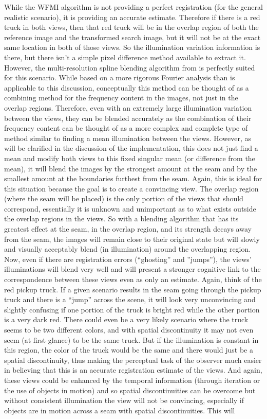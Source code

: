 While the WFMI algorithm is not providing a perfect registration (for the general realistic scenario), it is providing an accurate estimate. Therefore if there is a red truck in both views, then that red truck will be in the overlap region of both the reference image and the transformed search image, but it will not be at the exact same location in both of those views. So the illumination variation information is there, but there isn't a simple pixel difference method available to extract it. However, the multi-resolution spline blending algorithm from \cite{Burt1983} is perfectly suited for this scenario. While based on a more rigorous Fourier analysis than is applicable to this discussion, conceptually this method can be thought of as a combining method for the frequency content in the images, not just in the overlap regions. Therefore, even with an extremely large illumination variation between the views, they can be blended accurately as the combination of their frequency content can be thought of as a more complex and complete type of method similar to finding a mean illumination between the views. However, as will be clarified in the discussion of the implementation, this does not just find a mean and modify both views to this fixed singular mean (or difference from the mean), it will blend the images by the strongest amount at the seam and by the smallest amount at the boundaries furthest from the seam. Again, this is ideal for this situation because the goal is to create a convincing view. The overlap region (where the seam will be placed) is the only portion of the views that should correspond, essentially it is unknown and unimportant as to what exists outside the overlap regions in the views. So with a blending algorithm that has its greatest effect at the seam, \ie{ }in the overlap region, and its strength decays away from the seam, the images will remain close to their original state but will slowly and visually acceptably blend (in illumination) around the overlapping region. Now, even if there are registration errors (``ghosting'' and ''jumps''), the views' illuminations will blend very well and will present a stronger cognitive link to the correspondence between these views even as only an estimate. Again, think of the red pickup truck. If a given scenario results in the seam going through the pickup truck and there is a ``jump'' across the scene, it will look very unconvincing and slightly confusing if one portion of the truck is bright red while the other portion is a very dark red. There could even be a very likely scenario where the truck seems to be two different colors, and with spatial discontinuity it may not even seem (at first glance) to be the same truck. But if the illumination is constant in this region, the color of the truck would be the same and there would just be a spatial discontinuity, thus making the perceptual task of the observer much easier in believing that this is an accurate registration estimate of the views. And again, these views could be enhanced by the temporal information (through iteration or the use of objects in motion) and so spatial discontinuities can be overcome but without consistent illumination the view will not be convincing, especially if objects are in motion across a seam with spatial discontinuities. This will 